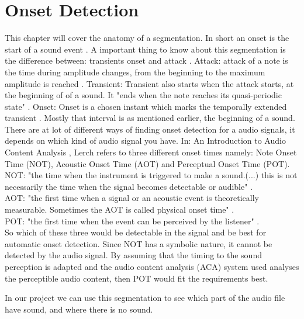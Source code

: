 \section{Onset Detection}
This chapter  will cover the anatomy of a segmentation.
In short an onset is the start of a sound event \citep{ACA}. 
A important thing to know about this segmentation is the difference between: transients onset and attack \citep{Bello2005}.
Attack: attack of a note is the time during amplitude changes, from the beginning to the maximum amplitude is reached \citep{ACA}.
Transient: Transient also starts when the attack starts, at the beginning of of a sound\citep{Bello2005}. It "ends when the note reaches its quasi-periodic state" \citep{ACA}.
Onset: Onset is a chosen instant which marks the temporally extended transient \citep{Bello2005}. Mostly that interval is as mentioned earlier, the beginning of a sound. 
\\
There are at lot of different ways of finding onset detection for a audio signals, it depends on which kind of audio signal you have\citep{Bello2005}.
In: An Introduction to Audio Content Analysis \citep{ACA}, Lerch refers to three different onset times namely: Note Onset Time (NOT), Acoustic Onset Time (AOT) and Perceptual Onset Time (POT)\citep{ACA}.
\\
NOT: "the time when the instrument is triggered to make a sound.(...) this is not necessarily the time when the signal becomes detectable or audible" \citep{ACA}.
\\
AOT: "the first time when a signal or an acoustic event is theoretically measurable. Sometimes the AOT is called physical onset time" \citep{ACA}.
\\
POT: "the first time when the event can be perceived by the
listener" \citep{ACA}.
\\
So which of these three would be detectable in the signal and be best for automatic onset detection. Since NOT has a symbolic nature, it cannot be detected by the audio signal\cite{ACA}. By assuming that the timing to the sound perception is adapted and the audio content analysis (ACA) system used analyses the perceptible audio content, then POT would fit the requirements best\cite{ACA}.

In our project we can use this segmentation to see which part of the audio file have sound, and where there is no sound. 

